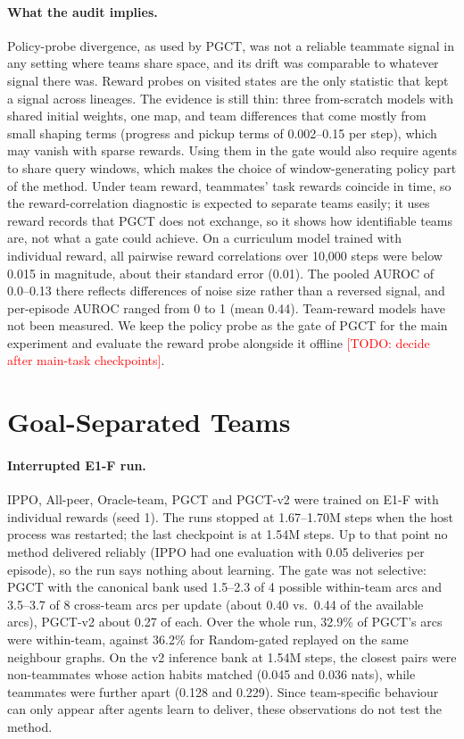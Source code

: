 \documentclass{article}
\theoremstyle{remark}
\newcommand{\todo}[1]{\textcolor{red}{[TODO: #1]}}
\newcommand{\ours}{PGCT}
\begin{document}
\paragraph{What the audit implies.} Policy-probe divergence, as used by \ours{}, was not a reliable teammate signal in any
setting where teams share space, and its drift was comparable to whatever signal there was. Reward probes on visited states are
the only statistic that kept a signal across lineages. The evidence is still thin: three from-scratch models with shared
initial weights, one map, and team differences that come mostly from small shaping terms (progress and pickup terms of
0.002--0.15 per step), which may vanish with sparse rewards. Using them in the gate would also require agents to share query windows,
which makes the choice of window-generating policy part of the method. Under team reward, teammates' task rewards coincide in time, so the
reward-correlation diagnostic is expected to separate teams easily; it uses reward records that \ours{} does not exchange, so it
shows how identifiable teams are, not what a gate could achieve. On a curriculum model trained with individual reward, all pairwise
reward correlations over 10{,}000 steps were below 0.015 in magnitude, about their standard error (0.01). The pooled AUROC of
0.0--0.13 there reflects differences of noise size rather than a reversed signal, and per-episode AUROC ranged from 0 to 1 (mean
0.44). Team-reward models have not been measured. We keep the policy probe as the gate of \ours{} for the main
experiment and evaluate the reward probe alongside it offline \todo{decide after main-task checkpoints}.

\section{Goal-Separated Teams}
\label{sec:main}
\paragraph{Interrupted E1-F run.} IPPO, All-peer, Oracle-team, \ours{} and \ours{}-v2 were trained on E1-F with individual
rewards (seed 1).
The runs stopped at 1.67--1.70M steps when the host process was restarted; the last checkpoint is at 1.54M steps. Up to that
point no method delivered reliably (IPPO had one evaluation with 0.05 deliveries per episode), so the run says nothing about
learning. The gate was not selective: \ours{} with the canonical bank used 1.5--2.3 of 4 possible within-team arcs and
3.5--3.7 of 8 cross-team arcs per update (about 0.40 vs.\ 0.44 of the available arcs), \ours{}-v2 about 0.27 of each. Over the
whole run, 32.9\% of \ours{}'s arcs were within-team, against 36.2\% for Random-gated replayed on the same neighbour graphs. On
the v2 inference bank at 1.54M steps, the closest pairs were non-teammates whose action habits matched (0.045 and 0.036 nats),
while teammates were further apart (0.128 and 0.229). Since team-specific behaviour can only appear after agents learn to
deliver, these observations do not test the method.
\end{document}
